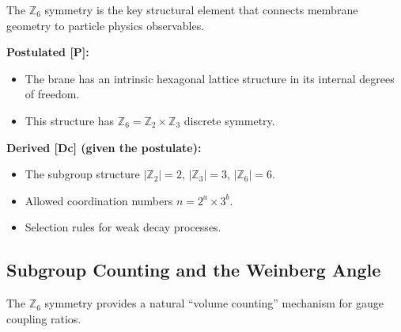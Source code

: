 \documentclass[11pt,a4paper]{article}
\begin{document}
The $\mathbb{Z}_6$ symmetry is the key structural element that connects membrane geometry to particle physics observables.

\begin{statusbox}
\textbf{Postulated [P]:}
\begin{itemize}
    \item The brane has an intrinsic hexagonal lattice structure in its internal degrees of freedom.
    \item This structure has $\mathbb{Z}_6 = \mathbb{Z}_2 \times \mathbb{Z}_3$ discrete symmetry.
\end{itemize}

\textbf{Derived [Dc] (given the postulate):}
\begin{itemize}
    \item The subgroup structure $|\mathbb{Z}_2| = 2$, $|\mathbb{Z}_3| = 3$, $|\mathbb{Z}_6| = 6$.
    \item Allowed coordination numbers $n = 2^a \times 3^b$.
    \item Selection rules for weak decay processes.
\end{itemize}
\end{statusbox}

\subsection{Subgroup Counting and the Weinberg Angle}

The $\mathbb{Z}_6$ symmetry provides a natural ``volume counting'' mechanism for gauge coupling ratios.
\end{document}
